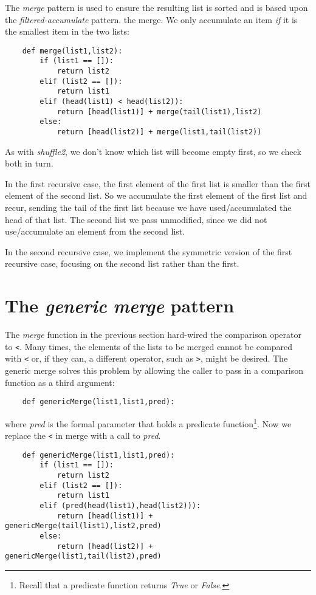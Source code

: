 The {\it merge} pattern is used to ensure the resulting list is
sorted and is based upon the {\it filtered-accumulate} pattern.
the merge. We only accumulate an item {\it if} it is the smallest item
in the two lists:

\begin{verbatim}
    def merge(list1,list2):
        if (list1 == []):
            return list2
        elif (list2 == []):
            return list1
        elif (head(list1) < head(list2)):
            return [head(list1)] + merge(tail(list1),list2)
        else:
            return [head(list2)] + merge(list1,tail(list2))
\end{verbatim}

As with {\it shuffle2}, we don't know which list will become empty
first, so we check both in turn.

In the first recursive case, the first element of the first list
is smaller than the first element of the second list.
So we accumulate the first element of the first list and
recur, sending the tail of the first list because we have
used/accumulated the head of that list. The second list we
pass unmodified, since we did not use/accumulate an element
from the second list.

In the second recursive case, we implement the symmetric version
of the first recursive case, focusing on the second list rather
than the first.

\section{The {\it generic} {\it merge} pattern}

The {\it merge} function in the previous section hard-wired the
comparison operator to \verb!<!. Many times, the elements
of the lists to be merged cannot be compared with \verb!<! or, if
they can, a different operator, such as \verb!>!, might be desired.
The generic merge solves this problem by allowing the caller to
pass in a comparison function as a third argument:

\begin{verbatim}
    def genericMerge(list1,list1,pred):
\end{verbatim}
        
where {\it pred} is the formal parameter that
holds a predicate function\footnote{Recall that a predicate
function returns {\it True} or {\it False}.}.
Now we replace the \verb!<! in merge with a call to {\it pred}.

\begin{verbatim}
    def genericMerge(list1,list1,pred):
        if (list1 == []):
            return list2
        elif (list2 == []):
            return list1
        elif (pred(head(list1),head(list2))):
            return [head(list1)] + genericMerge(tail(list1),list2,pred)
        else:
            return [head(list2)] + genericMerge(list1,tail(list2),pred)
\end{verbatim}

